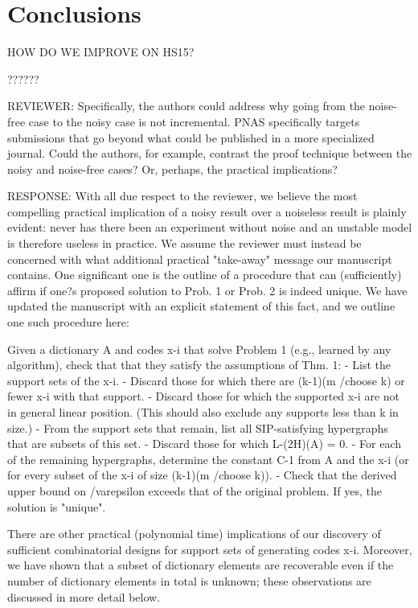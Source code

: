 \section{Conclusions}\label{conclusions}

HOW DO WE IMPROVE ON HS15?

??????

REVIEWER: Specifically, the authors could address why going from the noise-free case to the noisy case is not incremental. PNAS specifically targets submissions that go beyond what could be published in a more specialized journal. Could the authors, for example, contrast the proof technique between the noisy and noise-free cases? Or, perhaps, the practical implications?

RESPONSE: With all due respect to the reviewer, we believe the most compelling practical implication of a noisy result over a noiseless result is plainly evident: never has there been an experiment without noise and an unstable model is therefore useless in practice. We assume the reviewer must instead be concerned with what additional practical "take-away" message our manuscript contains.  One significant one is the outline of a procedure that can (sufficiently) affirm if one?s proposed solution to Prob. 1 or Prob. 2 is indeed unique. We have updated the manuscript with an explicit statement of this fact, and we outline one such procedure here:

Given a dictionary A and codes x-i that solve Problem 1 (e.g., learned by any algorithm), check that that they satisfy the assumptions of Thm. 1:
   - List the support sets of the x-i.
   - Discard those for which there are (k-1)(m /choose k) or fewer x-i with that support.
   - Discard those for which the supported x-i are not in general linear position. (This should also exclude any supports less than k in size.)
   - From the support sets that remain, list all SIP-satisfying hypergraphs that are subsets of this set.
   - Discard those for which L-(2H)(A) = 0.
   - For each of the remaining hypergraphs, determine the constant C-1 from A and the x-i (or for every subset of the x-i of size (k-1)(m /choose k)).
   - Check that the derived upper bound on /varepsilon exceeds that of the original problem. If yes, the solution is "unique".

There are other practical (polynomial time) implications of our discovery of sufficient combinatorial designs for support sets of generating codes x-i. Moreover, we have shown that a subset of dictionary elements are recoverable even if the number of dictionary elements in total is unknown; these observations are discussed in more detail below. 

